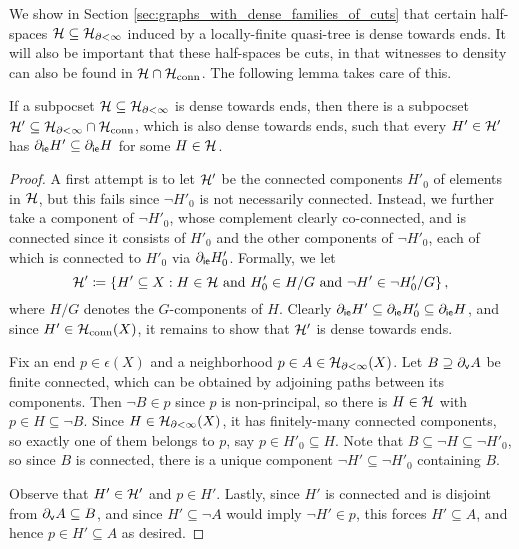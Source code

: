 \documentclass[reqno]{amsart}
\begin{document}
    We show in Section \ref{sec:graphs_with_dense_families_of_cuts} that certain half-spaces $\mathcal{H}\subseteq\mathcal{H}_{\partial<\infty}$ induced by a locally-finite quasi-tree is dense towards ends. It will also be important that these half-spaces be cuts, in that witnesses to density can also be found in $\mathcal{H}\cap\mathcal{H}_\mathrm{conn}$. The following lemma takes care of this.

    \begin{lemma}\label{lem:connected_witness_to_density}
        If a subpocset $\mathcal{H}\subseteq\mathcal{H}_{\partial<\infty}$ is dense towards ends, then there is a subpocset $\mathcal{H}'\subseteq\mathcal{H}_{\partial<\infty}\cap\mathcal{H}_\mathrm{conn}$, which is also dense towards ends, such that every $H'\in\mathcal{H}'$ has $\partial_\mathsf{ie}H'\subseteq\partial_\mathsf{ie}H$ for some $H\in\mathcal{H}$.
    \end{lemma}
    \begin{proof}
        A first attempt is to let $\mathcal{H}'$ be the connected components $H'_0$ of elements in $\mathcal{H}$, but this fails since $\lnot H'_0$ is not necessarily connected. Instead, we further take a component of $\lnot H'_0$, whose complement clearly co-connected, and is connected since it consists of $H'_0$ and the other components of $\lnot H'_0$, each of which is connected to $H'_0$ via $\partial_\mathsf{ie}H'_0$. Formally, we let
        \begin{equation*}
            \mathcal{H}'\coloneqq\left\{H'\subseteq X: H\in\mathcal{H}\textrm{ and }H'_0\in H/G\textrm{ and }\lnot H'\in\lnot H'_0/G\right\},
        \end{equation*}
        where $H/G$ denotes the $G$-components of $H$. Clearly $\partial_\mathsf{ie}H'\subseteq\partial_\mathsf{ie}H'_0\subseteq\partial_\mathsf{ie}H$, and since $H'\in\mathcal{H}_\mathrm{conn}(X)$, it remains to show that $\mathcal{H}'$ is dense towards ends.

        Fix an end $p\in\epsilon(X)$ and a neighborhood $p\in A\in\mathcal{H}_{\partial<\infty}(X)$. Let $B\supseteq\partial_\mathsf{v}A$ be finite connected, which can be obtained by adjoining paths between its components. Then $\lnot B\in p$ since $p$ is non-principal, so there is $H\in\mathcal{H}$ with $p\in H\subseteq\lnot B$. Since $H\in\mathcal{H}_{\partial<\infty}(X)$, it has finitely-many connected components, so exactly one of them belongs to $p$, say $p\in H'_0\subseteq H$. Note that $B\subseteq\lnot H\subseteq\lnot H'_0$, so since $B$ is connected, there is a unique component $\lnot H'\subseteq\lnot H'_0$ containing $B$.

        Observe that $H'\in\mathcal{H}'$ and $p\in H'$. Lastly, since $H'$ is connected and is disjoint from $\partial_\mathsf{v}A\subseteq B$, and since $H'\subseteq\lnot A$ would imply $\lnot H'\in p$, this forces $H'\subseteq A$, and hence $p\in H'\subseteq A$ as desired.
    \end{proof}
\end{document}
